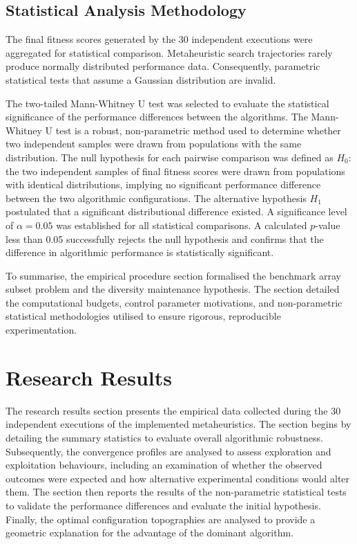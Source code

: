 \documentclass[conference]{IEEEtran}
\begin{document}
\subsection{Statistical Analysis Methodology}
The final fitness scores generated by the 30 independent executions were aggregated for statistical comparison. Metaheuristic search 
trajectories rarely produce normally distributed performance data. Consequently, parametric statistical tests that assume a Gaussian distribution are invalid. 

The two-tailed Mann-Whitney U test was selected to evaluate the statistical significance of the performance differences between 
the algorithms. The Mann-Whitney U test is a robust, non-parametric method used to determine whether two independent samples 
were drawn from populations with the same distribution. The null hypothesis for each pairwise comparison was defined as $H_0$: the two independent samples of final fitness scores were drawn from populations with identical distributions, implying no significant performance difference between the two algorithmic configurations. The alternative hypothesis $H_1$ postulated that a significant distributional difference existed. A significance level of $\alpha = 0.05$ was established for all statistical 
comparisons. A calculated $p$-value less than 0.05 successfully rejects the null hypothesis and confirms that the difference in algorithmic 
performance is statistically significant.

To summarise, the empirical procedure section formalised the benchmark array subset problem and the diversity maintenance hypothesis. 
The section detailed the computational budgets, control parameter motivations, and non-parametric statistical methodologies utilised 
to ensure rigorous, reproducible experimentation.

\section{Research Results}
 
The research results section presents the empirical data collected during the 30 independent
executions of the implemented metaheuristics. The section begins by detailing the summary
statistics to evaluate overall algorithmic robustness. Subsequently, the convergence profiles
are analysed to assess exploration and exploitation behaviours, including an examination of
whether the observed outcomes were expected and how alternative experimental conditions would
alter them. The section then reports the results of the non-parametric statistical tests to
validate the performance differences and evaluate the initial hypothesis. Finally, the optimal
configuration topographies are analysed to provide a geometric explanation for the advantage of the dominant
algorithm.
 
\end{document}
